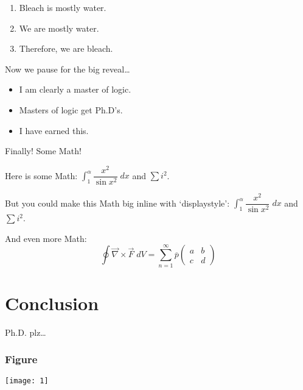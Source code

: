 \documentclass{beamer}
\newcommand{\ds}{\displaystyle}
\newcommand{\ov}[1]{\overline{#1}}
\newcommand{\twomatrix}[4]{\begin{pmatrix} #1 & #2 \\ #3 & #4 \end{pmatrix}}
\theoremstyle{definition}
\numberwithin{equation}{section}
\begin{document}
	
	
	\begin{frame}
		\begin{enumerate}[1.]
			\item Bleach is mostly water. \pause
			\item We are mostly water. \pause
			\item Therefore, we are bleach.
		\end{enumerate} \vspace{0.5cm}
		
		Now we pause for the big reveal\dots \pause \vspace{0.3cm}
		
		\begin{itemize}
			\item I am clearly a master of logic.
			\item Masters of logic get Ph.D's.
			\item I have earned this.
		\end{itemize}
	\end{frame}
	
	
	

	\begin{frame}
		Finally! Some Math! \vspace{1cm}
		
		Here is some Math: $\int_1^\alpha \dfrac{x^2}{\sin x^2} \;dx$ and $\sum i^2$. \vspace{1cm}
		
		But you could make this Math big inline with `displaystyle': $\ds \int_1^\alpha \dfrac{x^2}{\sin x^2} \;dx$ and $\ds \sum i^2$. \vspace{1cm}
		
		And even more Math:
		\[
		\oint \vec{\nabla} \times \vec{F} \;dV = \sum_{n=1}^\infty \ov{p} \twomatrix{a}{b}{c}{d}
		\]
	\end{frame}
	
	
	
	\section{Conclusion}
	
	
	
	\begin{frame}
		Ph.D. plz\dots
	\end{frame}


    \begin{frame}
    	\frametitle{Figure}
    	\begin{center}
    		\texttt{[image: 1]}    %
    	\end{center}
    \end{frame}
\end{document}
